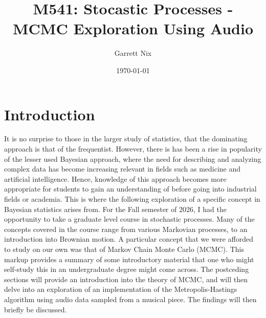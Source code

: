 \documentclass[11pt]{article}
\title{M541: Stocastic Processes - MCMC Exploration Using Audio}
\author{Garrett Nix}
\date{\today}
\theoremstyle{definition}
\begin{document}
\maketitle
\vspace{-2em}  %
\section{Introduction}
It is no surprise to those in the larger study of statistics, that the dominating approach is that of the frequentist. However, there is has been a rise in popularity of the lesser used Bayesian approach, where the need for describing and analyzing complex data has become increasing relevant in fields such as medicine and artificial intelligence. Hence, knowledge of this approach becomes more appropriate for students to gain an understanding of before going into industrial fields or academia. This is where the following exploration of a specific concept in Bayesian statistics arises from. For the Fall semester of 2026, I had the opportunity to take a graduate level course in stochastic processes. Many of the concepts covered in the course range from various Markovian processes, to an introduction into Brownian motion. A particular concept that we were afforded to study on our own was that of Markov Chain Monte Carlo (MCMC). This markup provides a summary of some introductory material that one who might self-study this in an undergraduate degree might come across. The postceding sections will provide an introduction into the theory of MCMC, and will then delve into an exploration of an implementation of the Metropolis-Hastings algorithm using audio data sampled from a musical piece. The findings will then briefly be discussed.
\end{document}
